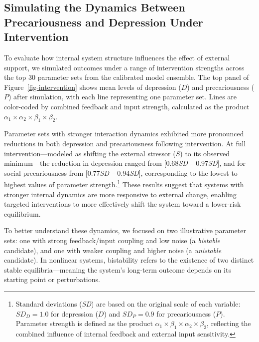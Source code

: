 \documentclass[
]{article}
\begin{document}
\subsection{Simulating the Dynamics Between Precariousness and
Depression Under
Intervention}\label{simulating-the-dynamics-between-precariousness-and-depression-under-intervention}

To evaluate how internal system structure influences the effect of
external support, we simulated outcomes under a range of intervention
strengths across the top 30 parameter sets from the calibrated model
ensemble. The top panel of Figure~\ref{fig-intervention} shows mean
levels of depression (\(D\)) and precariousness (\(P\)) after
simulation, with each line representing one parameter set. Lines are
color-coded by combined feedback and input strength, calculated as the
product \(\alpha_1 \times \alpha_2 \times \beta_1 \times \beta_2\).

Parameter sets with stronger interaction dynamics exhibited more
pronounced reductions in both depression and precariousness following
intervention. At full intervention---modeled as shifting the external
stressor (\(S\)) to its observed minimum---the reduction in depression
ranged from {[}0.68\emph{SD} -- 0.97\emph{SD}{]}, and for social
precariousness from {[}0.77\emph{SD} -- 0.94\emph{SD}{]}, corresponding
to the lowest to highest values of parameter strength.\footnote{Standard
  deviations (\emph{SD}) are based on the original scale of each
  variable: \(\textit{SD}_D = 1.0\) for depression (\(D\)) and
  \(\textit{SD}_P = 0.9\) for precariousness (\(P\)). Parameter strength
  is defined as the product
  \(\alpha_1 \times \beta_1 \times \alpha_2 \times \beta_2\), reflecting
  the combined influence of internal feedback and external input
  sensitivity.} These results suggest that systems with stronger
internal dynamics are more responsive to external change, enabling
targeted interventions to more effectively shift the system toward a
lower-risk equilibrium.

To better understand these dynamics, we focused on two illustrative
parameter sets: one with strong feedback/input coupling and low noise (a
\emph{bistable} candidate), and one with weaker coupling and higher
noise (a \emph{unistable} candidate). In nonlinear systems, bistability
refers to the existence of two distinct stable equilibria---meaning the
system's long-term outcome depends on its starting point or
perturbations.
\end{document}
